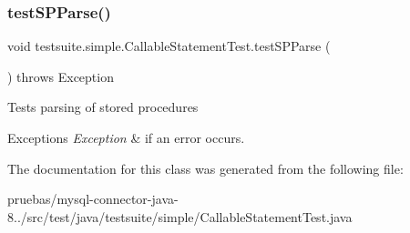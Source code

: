 \subsubsection{\texorpdfstring{test\+S\+P\+Parse()}{testSPParse()}}
{\footnotesize\ttfamily void testsuite.\+simple.\+Callable\+Statement\+Test.\+test\+S\+P\+Parse (\begin{DoxyParamCaption}{ }\end{DoxyParamCaption}) throws Exception}

Tests parsing of stored procedures


\begin{DoxyExceptions}{Exceptions}
{\em Exception} & if an error occurs. \\
\hline
\end{DoxyExceptions}


The documentation for this class was generated from the following file\+:\begin{DoxyCompactItemize}
\item 
pruebas/mysql-\/connector-\/java-\/8../src/test/java/testsuite/simple/Callable\+Statement\+Test.\+java\end{DoxyCompactItemize}
